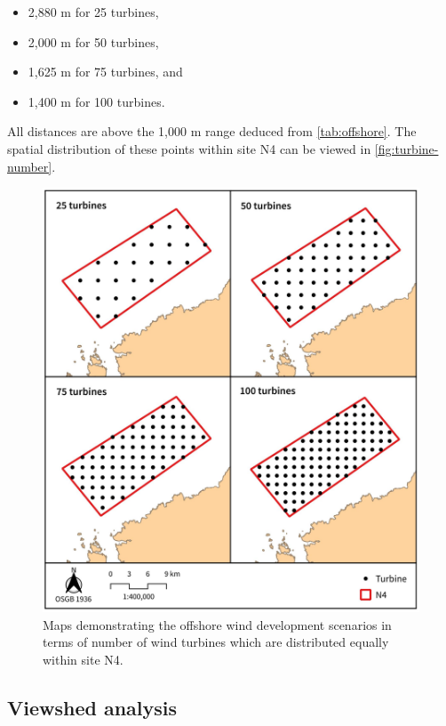 \begin{itemize}[noitemsep]
  \item 2,880 m for 25 turbines,
  \item 2,000 m for 50 turbines,
  \item 1,625 m for 75 turbines, and
  \item 1,400 m for 100 turbines.
\end{itemize}

All distances are above the 1,000 m range deduced from \autoref{tab:offshore}. The spatial distribution of these points within site N4 can be viewed in \autoref{fig:turbine-number}.

\begin{figure}
  \centering
  \includegraphics{images/maps/scenarios}
  \caption{Maps demonstrating the offshore wind development scenarios in terms of number of wind turbines which are distributed equally within site N4. \label{fig:turbine-number}}
\end{figure}

\newpage
\subsection{Viewshed analysis}

